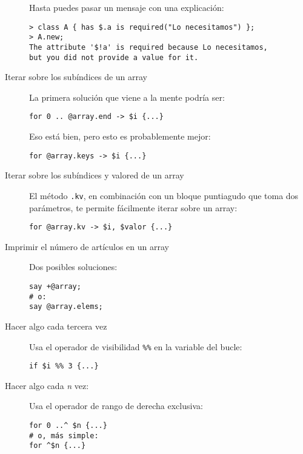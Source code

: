 \begin{description}
Hasta puedes pasar un mensaje con una explicación:

\begin{verbatim}
> class A { has $.a is required("Lo necesitamos") }; 
> A.new;
The attribute '$!a' is required because Lo necesitamos,
but you did not provide a value for it.
\end{verbatim}

\item[Iterar sobre los subíndices de un array] La primera
solución que viene a la mente podría ser:

\begin{verbatim}
for 0 .. @array.end -> $i {...}
\end{verbatim}

Eso está bien, pero esto es probablemente mejor:

\begin{verbatim}
for @array.keys -> $i {...}
\end{verbatim}

\item[Iterar sobre los subíndices y valored de un array] 
El método \verb|.kv|, en combinación con un bloque puntiagudo
que toma dos parámetros, te permite fácilmente iterar sobre un
array:

\begin{verbatim}
for @array.kv -> $i, $valor {...}
\end{verbatim}


\item[Imprimir el número de artículos en un array] Dos posibles
soluciones:

\begin{verbatim}
say +@array; 
# o:
say @array.elems; 
\end{verbatim}

\item[Hacer algo cada tercera vez] Usa el operador de
visibilidad \verb|%%| en la variable del bucle:
\begin{verbatim}
if $i %% 3 {...}  
\end{verbatim}

\item[Hacer algo cada \emph{n} vez:] Usa el operador de
rango de derecha exclusiva:

\begin{verbatim}
for 0 ..^ $n {...}
# o, más simple:
for ^$n {...} 
\end{verbatim}


\end{description}
